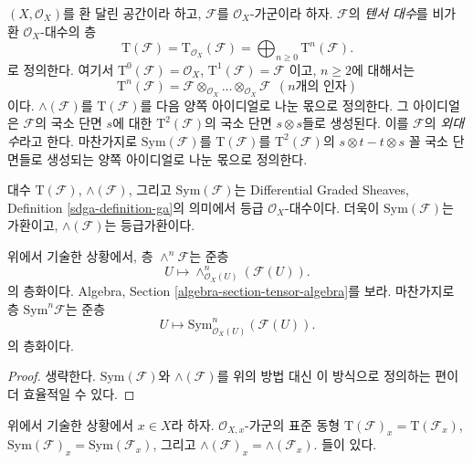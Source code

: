 \noindent
$(X, \mathcal{O}_X)$를 환 달린 공간이라 하고,
$\mathcal{F}$를 $\mathcal{O}_X$-가군이라 하자. $\mathcal{F}$의
{\it 텐서 대수}를 비가환 $\mathcal{O}_X$-대수의 층
$$
\text{T}(\mathcal{F})
=
\text{T}_{\mathcal{O}_X}(\mathcal{F})
= \bigoplus\nolimits_{n \geq 0} \text{T}^n(\mathcal{F}).
$$
로 정의한다. 여기서 $\text{T}^0(\mathcal{F}) = \mathcal{O}_X$,
$\text{T}^1(\mathcal{F}) = \mathcal{F}$
이고, $n \geq 2$에 대해서는
$$
\text{T}^n(\mathcal{F}) =
\mathcal{F} \otimes_{\mathcal{O}_X} \ldots \otimes_{\mathcal{O}_X} \mathcal{F}
\ \ (n\text{개의 인자})
$$
이다. $\wedge(\mathcal{F})$를 $\text{T}(\mathcal{F})$를 다음 양쪽
아이디얼로 나눈 몫으로 정의한다. 그 아이디얼은 $\mathcal{F}$의 국소 단면
$s$에 대한 $\text{T}^2(\mathcal{F})$의 국소 단면 $s \otimes s$들로
생성된다. 이를 $\mathcal{F}$의 {\it 외대수}라고 한다. 마찬가지로
$\text{Sym}(\mathcal{F})$를 $\text{T}(\mathcal{F})$를
$\text{T}^2(\mathcal{F})$의 $s \otimes t - t \otimes s$ 꼴 국소 단면들로
생성되는 양쪽 아이디얼로 나눈 몫으로 정의한다.

\medskip\noindent
대수 $\text{T}(\mathcal{F})$, $\wedge(\mathcal{F})$, 그리고
$\text{Sym}(\mathcal{F})$는 Differential Graded Sheaves, Definition
\ref{sdga-definition-ga}의 의미에서 등급 $\mathcal{O}_X$-대수이다.
더욱이 $\text{Sym}(\mathcal{F})$는 가환이고,
$\wedge(\mathcal{F})$는 등급가환이다.

\begin{lemma}
\label{lemma-local-tensor-algebra}
위에서 기술한 상황에서, 층 $\wedge^n\mathcal{F}$는 준층
$$
U \longmapsto \wedge^n_{\mathcal{O}_X(U)}(\mathcal{F}(U)).
$$
의 층화이다. Algebra, Section \ref{algebra-section-tensor-algebra}를 보라.
마찬가지로 층 $\text{Sym}^n\mathcal{F}$는 준층
$$
U \longmapsto \text{Sym}^n_{\mathcal{O}_X(U)}(\mathcal{F}(U)).
$$
의 층화이다.
\end{lemma}

\begin{proof}
생략한다. $\text{Sym}(\mathcal{F})$와 $\wedge(\mathcal{F})$를 위의
방법 대신 이 방식으로 정의하는 편이 더 효율적일 수 있다.
\end{proof}

\begin{lemma}
\label{lemma-stalk-tensor-algebra}
위에서 기술한 상황에서 $x \in X$라 하자. $\mathcal{O}_{X, x}$-가군의
표준 동형
$\text{T}(\mathcal{F})_x = \text{T}(\mathcal{F}_x)$,
$\text{Sym}(\mathcal{F})_x = \text{Sym}(\mathcal{F}_x)$, 그리고
$\wedge(\mathcal{F})_x = \wedge(\mathcal{F}_x)$.
들이 있다.
\end{lemma}

